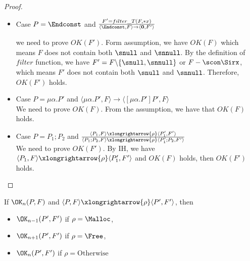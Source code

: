 \begin{proof}
\begin{itemize}
    \item Case \( P = \Endconst\) and \(\frac{F' = filter\_T(F, *x)} {
      \langle \Endconst, F \rangle \rightarrow \langle \mathbf{0}, F'
      \rangle } \) 

      we need to prove \(OK(F')\). Form assumption, we have \(OK(F)\)
      which means \(F\) does not contain both \(\snull\) and
      \(\snnull\). By the definition of \(filter\) function, we have
      \(F' = F\backslash\{\snull,\snnull\}\) or \(F-\scon\Sirx\),
      which means \(F'\) does not contain both \(\snull\) and
      \(\snnull\). Therefore, \(OK(F')\) holds.

    \item Case \( P = \mu\alpha.P'\) and \( \langle \mu\alpha.P', F \rangle
      \rightarrow \langle [\mu\alpha.P']P', F \rangle \) \\
      We need to prove \( OK(F)\). From the assumption, we have that
      \(OK(F)\) holds.

      


    \item Case \( P = P_1;P_2\) and \( \frac{ \langle P_1, F \rangle \xlongrightarrow{\rho} \langle P_1', F' \rangle }
      {\langle P_1;P_2, F \rangle \xlongrightarrow{\rho} \langle P_1';P_2, F' \rangle} \) \\
    We need to prove \(OK(F')\). By IH, we have \( \langle P_1, F
    \rangle \xlongrightarrow{\rho} \langle P_1', F' \rangle \) and \(
    OK(F) \) holds, then \(OK(F')\) holds.
      
  \end{itemize}
\end{proof}


\begin{lemma}
\label{lem:okPreserved}
If \(\OK_n(P, F)\) and \( \langle P, F \rangle \xlongrightarrow{\rho} \langle P', F' \rangle\), then
\begin{itemize}
\item \(\OK_{n-1}(P', F')\) if \(\rho = \Malloc\),
\item \(\OK_{n+1}(P', F')\) if \(\rho = \Free\),
\item \(\OK_n(P', F')\) if \(\rho = \mbox{Otherwise}  \)
\end{itemize}
\end{lemma}


